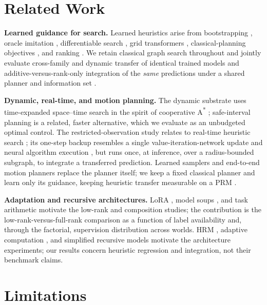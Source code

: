 \documentclass[letterpaper]{article} %
\begin{document}
\section{Related Work}

\textbf{Learned guidance for search.} Learned heuristics arise from bootstrapping \citep{arfaee2011bootstrap}, oracle imitation \citep{bhardwaj2017sail}, differentiable search \citep{yonetani2021neuralastar}, grid transformers \citep{kirilenko2023transpath}, classical-planning objectives \citep{ferber2020neural}, and ranking \citep{chrestien2023rank}. We retain classical graph search throughout and jointly evaluate cross-family and dynamic transfer of identical trained models and additive-versus-rank-only integration of the \emph{same} predictions under a shared planner and information set \citep{pohl1970,pearl1982semiadmissible,aine2016mha}.

\textbf{Dynamic, real-time, and motion planning.} The dynamic substrate uses time-expanded space--time search in the spirit of cooperative A\textsuperscript{*} \citep{silver2005cooperative}; safe-interval planning \citep{phillips2011sipp} is a related, faster alternative, which we evaluate as an unbudgeted optimal control. The restricted-observation study relates to real-time heuristic search \citep{korf1990rta,koenig2006rtaa}; its one-step backup resembles a single value-iteration-network update \citep{tamar2016vin,lee2018gppn} and neural algorithm execution \citep{velickovic2021nar}, but runs once, at inference, over a radius-bounded subgraph, to integrate a transferred prediction. Learned samplers and end-to-end motion planners \citep{ichter2018sampling,qureshi2019mpnet} replace the planner itself; we keep a fixed classical planner and learn only its guidance, keeping heuristic transfer measurable on a PRM \citep{kavraki1996prm}.

\textbf{Adaptation and recursive architectures.} LoRA \citep{hu2021lora}, model soups \citep{wortsman2022soups}, and task arithmetic \citep{ilharco2022task} motivate the low-rank and composition studies; the contribution is the low-rank-versus-full-rank comparison as a function of label availability and, through the factorial, supervision distribution across worlds. HRM \citep{wang2025hrm}, adaptive computation \citep{graves2016act,banino2021pondernet}, and simplified recursive models \citep{jolicoeur2025trm} motivate the architecture experiments; our results concern heuristic regression and integration, not their benchmark claims.

\section{Limitations}
\end{document}
